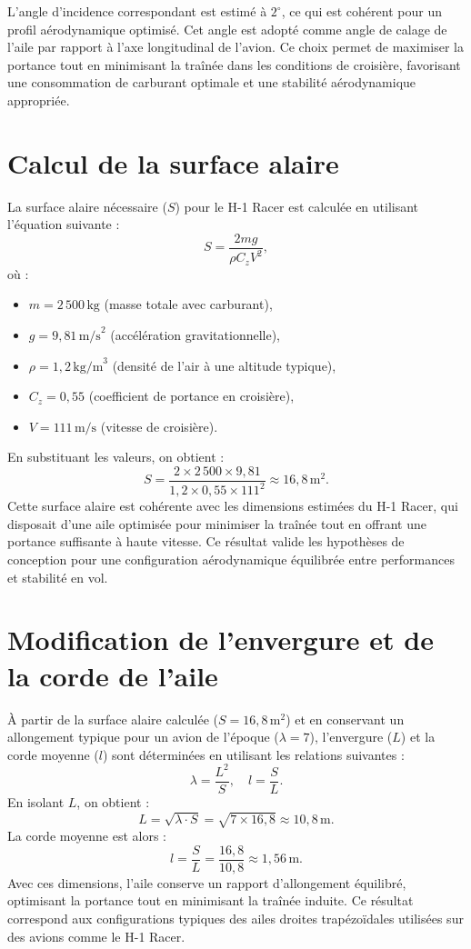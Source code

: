 \documentclass[12pt,a4paper]{article}
\begin{document}
L’angle d’incidence correspondant est estimé à $2^\circ$, ce qui est cohérent pour un profil aérodynamique optimisé. Cet angle est adopté comme angle de calage de l’aile par rapport à l’axe longitudinal de l’avion. Ce choix permet de maximiser la portance tout en minimisant la traînée dans les conditions de croisière, favorisant une consommation de carburant optimale et une stabilité aérodynamique appropriée.

\section{Calcul de la surface alaire}

La surface alaire nécessaire ($S$) pour le H-1 Racer est calculée en utilisant l’équation suivante :
\[
S = \frac{2mg}{\rho C_z V^2},
\]
où :
\begin{itemize}
    \item $m = 2\,500 \, \text{kg}$ (masse totale avec carburant),
    \item $g = 9{,}81 \, \text{m/s}^2$ (accélération gravitationnelle),
    \item $\rho = 1{,}2 \, \text{kg/m}^3$ (densité de l’air à une altitude typique),
    \item $C_z = 0{,}55$ (coefficient de portance en croisière),
    \item $V = 111 \, \text{m/s}$ (vitesse de croisière).
\end{itemize}

En substituant les valeurs, on obtient :
\[
S = \frac{2 \times 2\,500 \times 9{,}81}{1{,}2 \times 0{,}55 \times 111^2} \approx 16{,}8 \, \text{m}^2.
\]
Cette surface alaire est cohérente avec les dimensions estimées du H-1 Racer, qui disposait d’une aile optimisée pour minimiser la traînée tout en offrant une portance suffisante à haute vitesse. Ce résultat valide les hypothèses de conception pour une configuration aérodynamique équilibrée entre performances et stabilité en vol.

\section{Modification de l’envergure et de la corde de l’aile}

À partir de la surface alaire calculée ($S = 16{,}8 \, \text{m}^2$) et en conservant un allongement typique pour un avion de l’époque ($\lambda = 7$), l’envergure ($L$) et la corde moyenne ($l$) sont déterminées en utilisant les relations suivantes :
\[
\lambda = \frac{L^2}{S}, \quad l = \frac{S}{L}.
\]
En isolant $L$, on obtient :
\[
L = \sqrt{\lambda \cdot S} = \sqrt{7 \times 16{,}8} \approx 10{,}8 \, \text{m}.
\]
La corde moyenne est alors :
\[
l = \frac{S}{L} = \frac{16{,}8}{10{,}8} \approx 1{,}56 \, \text{m}.
\]
Avec ces dimensions, l’aile conserve un rapport d’allongement équilibré, optimisant la portance tout en minimisant la traînée induite. Ce résultat correspond aux configurations typiques des ailes droites trapézoïdales utilisées sur des avions comme le H-1 Racer.
\end{document}
